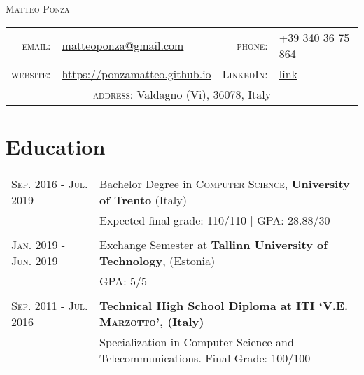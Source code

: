 \documentclass[a4paper,10pt]{article}
\begin{document}
\pagestyle{empty} %
\par{\centering
		{\Huge \textsc{Matteo Ponza}
	}\bigskip\par}

\begin{center}
\begin{tabular}{rlrl}
  \textsc{email:}     & \href{mailto:matteoponza@gmail.com}{matteoponza@gmail.com} &
  \textsc{phone:}     & +39 340 36 75 864\\
  \textsc{website:}   & \href{https://ponzamatteo.github.io/}{https://ponzamatteo.github.io} & \textsc{LinkedIn:} & \href{https://www.linkedin.com/in/matteo-ponza-557136135}{link}\\
  \multicolumn{4}{c}{\textsc{address:} \quad Valdagno (Vi), 36078, Italy} \\
\end{tabular}
\end{center}

\section{Education}
\begin{tabular}{m{0.25\linewidth}|p{0.75\linewidth}}
  \textsc{Sep. 2016 - Jul. 2019} &
  Bachelor Degree in \textsc{Computer Science},
  \textbf{University of Trento} (Italy)\\
  & Expected final grade: 110/110 | \textsc{GPA}: 28.88/30\\
  \multicolumn{2}{c}{} \\

  \textsc{Jan. 2019 - Jun. 2019}& 
  Exchange Semester at \textbf{Tallinn University of Technology}, (Estonia)\\& GPA: 5/5 \\

  \multicolumn{2}{c}{} \\
  \textsc{Sep. 2011 - Jul. 2016} &
  \textbf{Technical High School Diploma at \textsc{ITI ‘V.E. Marzotto’}, (Italy)}
\\ & Specialization in Computer Science and Telecommunications. Final Grade: 100/100
\end{tabular}
\end{document}
